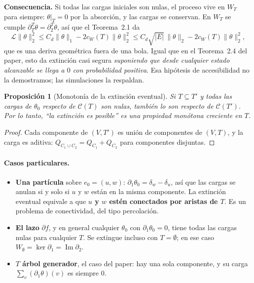 \documentclass[11pt,a4paper]{article}
\theoremstyle{plain}
\newtheorem{proposicion}{Proposición}[section]
\theoremstyle{remark}
\newcommand{\Lgen}{\mathcal{L}}
\newcommand{\norm}[1]{\lVert #1\rVert}
\begin{document}
\noindent\textbf{Consecuencia.} Si todas las cargas iniciales son nulas, el proceso vive en $W_T$ para siempre: $\theta|_T=0$ por la absorción, y las cargas se conservan. En $W_T$ se cumple $\partial_T^T\theta=\partial_2^T\theta$, así que el Teorema~2.1 da
\[
\Lgen\norm{\theta}_2^2\le C_d\norm{\theta}_1-2c_W(T)\norm{\theta}_2^2\le C_d\sqrt{|E|}\,\norm{\theta}_2-2c_W(T)\norm{\theta}_2^2 ,
\]
que es una deriva geométrica fuera de una bola. Igual que en el Teorema~2.4 del paper, esto da extinción casi segura \emph{suponiendo que desde cualquier estado alcanzable se llega a $0$ con probabilidad positiva}. Esa hipótesis de accesibilidad no la demostramos; las simulaciones la respaldan.

\begin{proposicion}[Monotonía de la extinción eventual]\label{prop:monotonia}
Si $T\subseteq T'$ y todas las cargas de $\theta_0$ respecto de $\mathcal C(T)$ son nulas, también lo son respecto de $\mathcal C(T')$. Por lo tanto, ``la extinción es posible'' es una propiedad monótona creciente en $T$.
\end{proposicion}

\begin{proof}
Cada componente de $(V,T')$ es unión de componentes de $(V,T)$, y la carga es aditiva: $Q_{C_1\cup C_2}=Q_{C_1}+Q_{C_2}$ para componentes disjuntas.
\end{proof}

\paragraph{Casos particulares.}
\begin{itemize}
  \item \textbf{Una partícula} sobre $e_0=(u,w)$: $\partial_1\theta_0=\delta_w-\delta_u$, así que las cargas se anulan si y solo si $u$ y $w$ están en la misma componente. La extinción eventual equivale a que \textbf{$u$ y $w$ estén conectados por aristas de $T$}. Es un problema de conectividad, del tipo percolación.
  \item \textbf{El lazo} $\partial f$, y en general cualquier $\theta_0$ con $\partial_1\theta_0=0$, tiene todas las cargas nulas para cualquier $T$. Se extingue incluso con $T=\emptyset$; en ese caso $W_\emptyset=\ker\partial_1=\operatorname{Im}\partial_2$.
  \item \textbf{$T$ árbol generador}, el caso del paper: hay una sola componente, y su carga $\sum_v(\partial_1\theta)(v)$ es siempre $0$.
\end{itemize}
\end{document}

